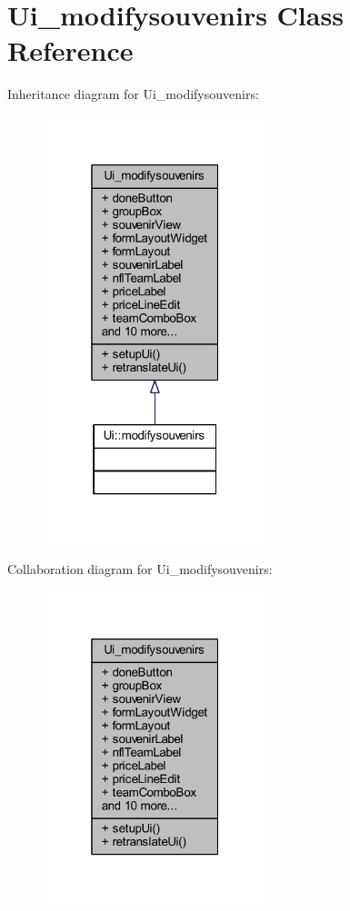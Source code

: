 \hypertarget{class_ui__modifysouvenirs}{}\section{Ui\+\_\+modifysouvenirs Class Reference}
\label{class_ui__modifysouvenirs}


Inheritance diagram for Ui\+\_\+modifysouvenirs\+:\nopagebreak
\begin{figure}[H]
\begin{center}
\leavevmode
\includegraphics[width=184pt]{class_ui__modifysouvenirs__inherit__graph}
\end{center}
\end{figure}


Collaboration diagram for Ui\+\_\+modifysouvenirs\+:\nopagebreak
\begin{figure}[H]
\begin{center}
\leavevmode
\includegraphics[width=184pt]{class_ui__modifysouvenirs__coll__graph}
\end{center}
\end{figure}
